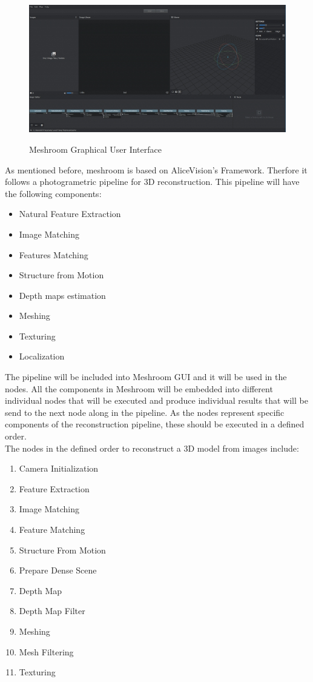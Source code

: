 \documentclass[12pt]{report}
\begin{document}
\begin{figure}[h]
  \centering
  \includegraphics[width=1\textwidth]{meshroom_gui.jpg}
  \caption{Meshroom Graphical User Interface}\cite[]{meshroom}
  \label{fig:meshroom_gui} 
\end{figure}

\newpage
As mentioned before, meshroom is based on AliceVision's Framework. Therfore it follows a photogrametric pipeline for 3D reconstruction. 
This pipeline will have the following components:
\begin{itemize}
  \item Natural Feature Extraction
  \item Image Matching
  \item Features Matching
  \item Structure from Motion
  \item Depth maps estimation
  \item Meshing
  \item Texturing
  \item Localization
\end{itemize}

The pipeline will be included into Meshroom GUI and it will be used in the nodes. All the components in Meshroom will be embedded into different individual nodes that will be executed and produce individual results that will be send to the next node along in the pipeline.
As the nodes represent specific components of the reconstruction pipeline, these should be executed in a defined order.\\
The nodes in the defined order to reconstruct a 3D model from images include:
\begin{enumerate}
  \item Camera Initialization 
  \item Feature Extraction
  \item Image Matching
  \item Feature Matching
  \item Structure From Motion
  \item Prepare Dense Scene
  \item Depth Map
  \item Depth Map Filter
  \item Meshing
  \item Mesh Filtering
  \item Texturing
\end{enumerate}
\end{document}
